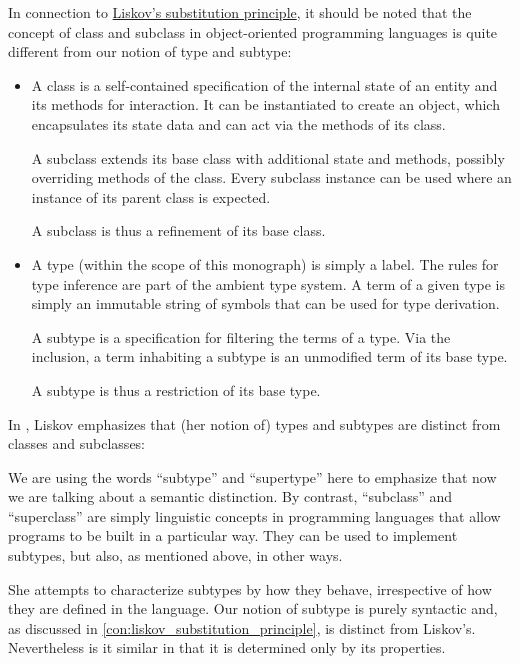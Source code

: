 \begin{remark}\label{rem:types_and_classes}
  In connection to \hyperref[con:liskov_substitution_principle]{Liskov's substitution principle}, it should be noted that the concept of class and subclass in object-oriented programming languages is quite different from our notion of type and subtype:
  \begin{itemize}
    \item A class is a self-contained specification of the internal state of an entity and its methods for interaction. It can be instantiated to create an object, which encapsulates its state data and can act via the methods of its class.

    A subclass extends its base class with additional state and methods, possibly overriding methods of the class. Every subclass instance can be used where an instance of its parent class is expected.

    A subclass is thus a refinement of its base class.

    \item A type (within the scope of this monograph) is simply a label. The rules for type inference are part of the ambient type system. A term of a given type is simply an immutable string of symbols that can be used for type derivation.

    A subtype is a specification for filtering the terms of a type. Via the inclusion, a term inhabiting a subtype is an unmodified term of its base type.

    A subtype is thus a restriction of its base type.
  \end{itemize}

  In \cite[25]{Liskov1987DataAbstractionAndHierarchy}, Liskov emphasizes that (her notion of) types and subtypes are distinct from classes and subclasses:
  \begin{displayquote}
    We are using the words \enquote{subtype} and \enquote{supertype} here to emphasize that now we are talking about a semantic distinction. By contrast, \enquote{subclass} and \enquote{superclass} are simply linguistic concepts in programming languages that allow programs to be built in a particular way. They can be used to implement subtypes, but also, as mentioned above, in other ways.
  \end{displayquote}

  She attempts to characterize subtypes by how they behave, irrespective of how they are defined in the language. Our notion of subtype is purely syntactic and, as discussed in \cref{con:liskov_substitution_principle}, is distinct from Liskov's. Nevertheless is it similar in that it is determined only by its properties.
\end{remark}


